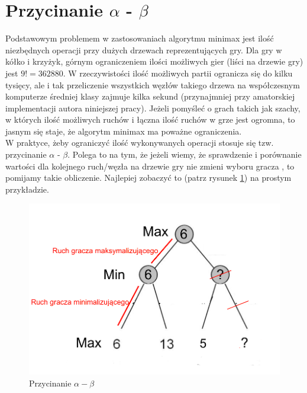 \documentclass[licencjacka]{pracamgr}
\begin{document}
\section{Przycinanie $\alpha$ - $\beta$}
Podstawowym problemem w zastosowaniach algorytmu minimax jest ilość niezbędnych operacji przy dużych drzewach reprezentujących gry.  Dla gry w kółko i krzyżyk, górnym ograniczeniem ilości możliwych gier (liści na drzewie gry) jest $9! = 362880$. W rzeczywistości ilość możliwych partii ogranicza się do kilku tysięcy, ale i tak przeliczenie wszystkich węzłów takiego drzewa na współczesnym komputerze średniej klasy zajmuje kilka sekund (przynajmniej przy amatorskiej implementacji autora niniejszej pracy). Jeżeli pomyśleć o grach takich jak szachy, w których ilość możliwych ruchów i łączna ilość ruchów w grze jest ogromna, to jasnym się staje, że algorytm minimax ma poważne ograniczenia.  \\

W praktyce, żeby ograniczyć ilość wykonywanych operacji stosuje się tzw. przycinanie  $\alpha$ - $\beta$. Polega to na tym, że jeżeli wiemy, że sprawdzenie i porównanie wartości dla kolejnego ruch/węzła na drzewie gry nie zmieni wyboru gracza , to pomijamy takie obliczenie. Najlepiej zobaczyć to (patrz rysunek \ref{Rys3}) na prostym przykładzie. 


\begin{figure}[h!]
	\includegraphics [scale=0.3] {advertise2.png}
	\caption{Przycinanie $\alpha - \beta$}
	\label{Rys3}
\end{figure}
\end{document}
